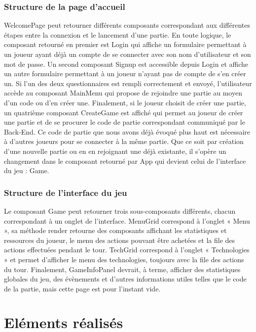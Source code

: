 \documentclass[12pt,twoside,a4paper]{article}
\begin{document}
\subsubsection{Structure de la page d’accueil}
WelcomePage peut retourner différents composants correspondant aux différentes étapes entre la connexion et le lancement d’une partie. 
En toute logique, le composant retourné en premier est Login qui affiche un formulaire permettant à un joueur ayant déjà un compte de se connecter avec son nom d’utilisateur et son mot de passe. 
Un second composant Signup est accessible depuis Login et affiche un autre formulaire permettant à un joueur n’ayant pas de compte de s’en créer un. 
Si l’un des deux questionnaires est rempli correctement et envoyé, l’utilisateur accède au composant MainMenu qui propose de rejoindre une partie au moyen d’un code ou d’en créer une. 
Finalement, si le joueur choisit de créer une partie, un quatrième composant CreateGame est affiché qui permet au joueur de créer une partie et de se procurer le code de partie correspondant communiqué par le Back-End. Ce code de partie que nous avons déjà évoqué plus haut est nécessaire à d’autres joueurs pour se connecter à la même partie.
Que ce soit par création d’une nouvelle partie ou en en rejoignant une déjà existante, il s’opère un changement dans le composant retourné par App qui devient celui de l’interface du jeu : Game.

\subsubsection{Structure de l’interface du jeu}
Le composant Game peut retourner trois sous-composants différents, chacun correspondant à un onglet de l’interface.
MenuGrid correspond à l’onglet « Menu », sa méthode render retourne des composants affichant les statistiques et ressources du joueur, le menu des actions pouvant être achetées et la file des actions effectuées pendant le tour. 
TechGrid correspond à l’onglet « Technologies » et permet d’afficher le menu des technologies, toujours avec la file des actions du tour.
Finalement, GameInfoPanel devrait, à terme, afficher des statistiques globales du jeu, des évènements et d’autres informations utiles telles que le code de la partie, mais cette page est pour l’instant vide.

\section{El\'ements r\'ealis\'es}
\end{document}
